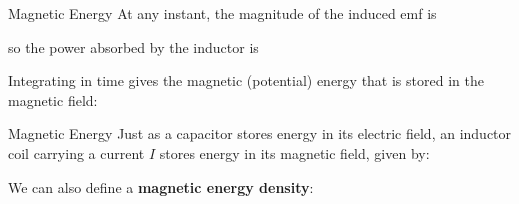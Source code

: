 \documentclass[12pt,aspectratio=169]{beamer}
\begin{document}
\begin{frame}{Magnetic Energy}
  At any instant, the magnitude of the induced emf is

  so the power absorbed by the inductor is


  Integrating in time gives the magnetic (potential) energy that is stored in
  the magnetic field:

\end{frame}



\begin{frame}{Magnetic Energy}
  Just as a capacitor stores energy in its electric field, an inductor coil
  carrying a current $I$ stores energy in its magnetic field, given by:


  We can also define a \textbf{magnetic energy density}:

\end{frame}
\end{document}
